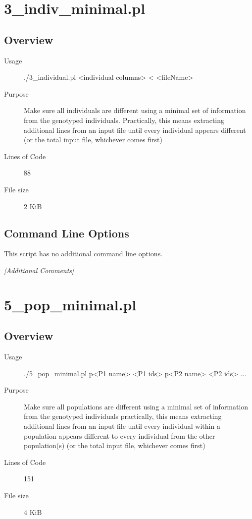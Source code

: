 \section{3_indiv_minimal.pl}
\label{sec:3-indiv-minimal.pl}

\subsection{Overview}
\label{sec:3-indiv-minimal.pl-overview}

\begin{description}
\item[Usage] ./3_individual.pl <individual columns> < <fileName>
\item[Purpose] Make sure all individuals are different using a minimal set of information from the genotyped individuals. Practically, this means extracting additional lines from an input file until every individual appears different (or the total input file, whichever comes first)
\item[Lines of Code] 88
\item[File size] 2 KiB
\end{description}

\subsection{Command Line Options}
\label{sec:3-indiv-minimal.pl-command-line}

This script has no additional command line options.

\emph{[Additional Comments]}

\section{5_pop_minimal.pl}
\label{sec:5-pop-minimal.pl}

\subsection{Overview}
\label{sec:5-pop-minimal.pl-overview}

\begin{description}
\item[Usage] ./5_pop_minimal.pl p<P1 name> <P1 ids> p<P2 name> <P2 ids> ...
\item[Purpose] Make sure all populations are different using a minimal set of information from the genotyped individuals practically, this means extracting additional lines from an input file until every individual within a population appears different to every individual from the other population(s) (or the total input file, whichever comes first)
\item[Lines of Code] 151
\item[File size] 4 KiB
\end{description}

